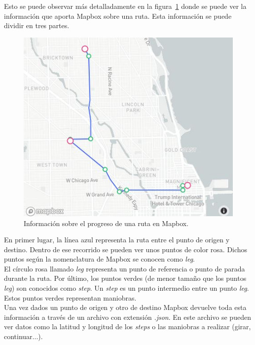 Esto se puede observar más detalladamente en la figura~\ref{fig:mapboxprogressroute} donde se puede ver la información que aporta Mapbox sobre una ruta. Esta información se puede dividir en tres partes.


\begin{figure}[H]
    \centering
    \includegraphics[scale=0.9]{Images/Mapas/mapboxrouteprogress.JPG}
    \caption[Información sobre el progreso de una ruta en Mapbox]{Información sobre el progreso de una ruta en Mapbox\footnotemark.}
    \label{fig:mapboxprogressroute}
\end{figure}


En primer lugar, la línea azul representa la ruta entre el punto de origen y destino. Dentro de ese recorrido se pueden ver unos puntos de color rosa. Dichos puntos según la nomenclatura de Mapbox se conocen como \textit{leg}.\\

El círculo rosa llamado \textit{leg} representa un punto de referencia o punto de parada durante la ruta. Por último, los puntos verdes (de menor tamaño que los puntos \textit{leg}) son conocidos como \textit{step}. Un \textit{step} es un punto intermedio entre un punto \textit{leg}. Estos puntos verdes representan maniobras.\\

Una vez dados un punto de origen y otro de destino Mapbox devuelve toda esta información a través de un archivo con extensión \textit{.json}. En este archivo se pueden ver datos como la latitud y longitud de los \textit{steps} o las maniobras a realizar (girar, continuar...). 


